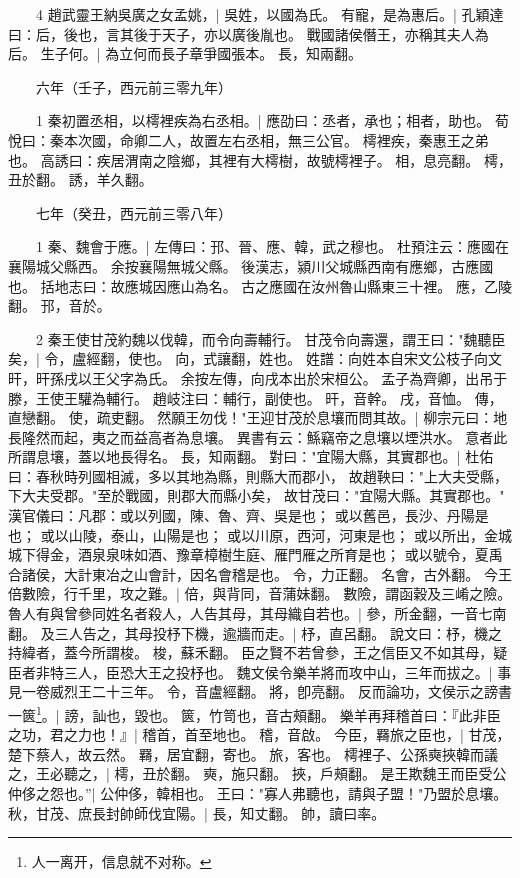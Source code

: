 　　4 趙武靈王納吳廣之女孟姚，|{
	吳姓，以國為氏。
}
有寵，是為惠后。|{
	孔穎達曰：后，後也，言其後于天子，亦以廣後胤也。
	戰國諸侯僭王，亦稱其夫人為后。
}
生子何。|{
	為立何而長子章爭國張本。
	長，知兩翻。
}

　　六年（壬子，西元前三零九年）

　　1 秦初置丞相，以樗裡疾為右丞相。|{
	應劭曰：丞者，承也；相者，助也。
	荀悅曰：秦本次國，命卿二人，故置左右丞相，無三公官。
	樗裡疾，秦惠王之弟也。
	高誘曰：疾居渭南之陰鄉，其裡有大樗樹，故號樗裡子。
	相，息亮翻。
	樗，丑於翻。
	誘，羊久翻。
}

　　七年（癸丑，西元前三零八年）

　　1 秦、魏會于應。|{
	左傳曰：邘、晉、應、韓，武之穆也。
	杜預注云：應國在襄陽城父縣西。
	余按襄陽無城父縣。
	後漢志，潁川父城縣西南有應鄉，古應國也。
	括地志曰：故應城因應山為名。
	古之應國在汝州魯山縣東三十裡。
	應，乙陵翻。
	邘，音於。
}

　　2 秦王使甘茂約魏以伐韓，而令向壽輔行。
	甘茂令向壽還，謂王曰："魏聽臣矣，|{
	令，盧經翻，使也。
	向，式讓翻，姓也。
	姓譜：向姓本自宋文公枝子向文旰，旰孫戌以王父字為氏。
	余按左傳，向戌本出於宋桓公。
	孟子為齊卿，出吊于滕，王使王驩為輔行。
	趙岐注曰：輔行，副使也。
	旰，音幹。
	戌，音恤。
	傳，直戀翻。
	使，疏吏翻。
}
然願王勿伐！"王迎甘茂於息壤而問其故。|{
	柳宗元曰：地長隆然而起，夷之而益高者為息壤。
	異書有云：鯀竊帝之息壤以堙洪水。
	意者此所謂息壤，蓋以地長得名。
	長，知兩翻。
}
對曰："宜陽大縣，其實郡也。|{
	杜佑曰：春秋時列國相滅，多以其地為縣，則縣大而郡小，
	故趙鞅曰："上大夫受縣，下大夫受郡。"至於戰國，則郡大而縣小矣，
	故甘茂曰："宜陽大縣。其實郡也。"
	漢官儀曰：凡郡：或以列國，陳、魯、齊、吳是也；
	或以舊邑，長沙、丹陽是也；
	或以山陵，泰山，山陽是也；
	或以川原，西河，河東是也；
	或以所出，金城城下得金，酒泉泉味如酒、豫章樟樹生庭、雁門雁之所育是也；
	或以號令，夏禹合諸侯，大計東冶之山會計，因名會稽是也。
	令，力正翻。
	名會，古外翻。
}
今王倍數險，行千里，攻之難。|{
	倍，與背同，音蒲妹翻。
	數險，謂函穀及三崤之險。
}
魯人有與曾參同姓名者殺人，人告其母，其母織自若也。|{
	參，所金翻，一音七南翻。
}
及三人告之，其母投杼下機，逾牆而走。|{
	杼，直呂翻。
	說文曰：杼，機之持緯者，蓋今所謂梭。
	梭，蘇禾翻。
}
臣之賢不若曾參，王之信臣又不如其母，疑臣者非特三人，臣恐大王之投杼也。
	魏文侯令樂羊將而攻中山，三年而拔之。|{
	事見一卷威烈王二十三年。
	令，音盧經翻。
	將，卽亮翻。
}
反而論功，文侯示之謗書一篋\footnote{人一离开，信息就不对称。}。|{
	謗，訕也，毀也。
	篋，竹笥也，音古頰翻。
}
樂羊再拜稽首曰：『此非臣之功，君之力也！』|{
	稽首，首至地也。
	稽，音啟。
}
今臣，羇旅之臣也，|{
	甘茂，楚下蔡人，故云然。
	羇，居宜翻，寄也。
	旅，客也。
}
樗裡子、公孫奭挾韓而議之，王必聽之，|{
	樗，丑於翻。
	奭，施只翻。
	挾，戶頰翻。
}
是王欺魏王而臣受公仲侈之怨也。”|{
	公仲侈，韓相也。
}
王曰："寡人弗聽也，請與子盟！"乃盟於息壤。
	秋，甘茂、庶長封帥師伐宜陽。|{
	長，知丈翻。
	帥，讀曰率。
}

